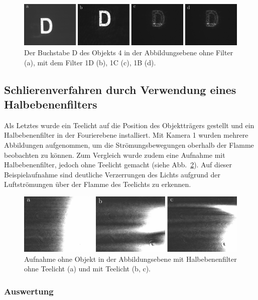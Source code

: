 \begin{figure}[h]
	\centering
	\includegraphics{images/ergebniss_D/abb.pdf}
	\caption{
		Der Buchstabe D des Objekts 4 in der Abbildungsebene ohne Filter (a), mit dem Filter 1D (b), 1C (c), 1B (d).
	}
	\label{fig:example10_Filter1B}
\end{figure}


\subsection{Schlierenverfahren durch Verwendung eines Halbebenenfilters}

Als Letztes wurde ein Teelicht auf die Position des Objektträgers gestellt und ein Halbebenenfilter in der Fourierebene installiert. Mit Kamera 1 wurden mehrere Abbildungen aufgenommen, um die Strömungsbewegungen oberhalb der Flamme beobachten zu können. Zum Vergleich wurde zudem eine Aufnahme mit Halbebenenfilter, jedoch ohne Teelicht gemacht (siehe Abb.~\ref{fig:Halbebenenfilter_mit_und_ohne_Teelicht}). Auf dieser Beispielaufnahme sind deutliche Verzerrungen des Lichts aufgrund der Luftströmungen über der Flamme des Teelichts zu erkennen. 

\begin{figure}[h]
	\centering
	\includegraphics{images/ergebniss_Teelicht/abb.pdf}
	\caption[Schlieren]{
		Aufnahme ohne Objekt in der Abbildungsebene mit Halbebenenfilter ohne Teelicht (a) und mit Teelicht (b, c).
	}
	\label{fig:Halbebenenfilter_mit_und_ohne_Teelicht}
\end{figure}


\subsubsection*{Auswertung}

